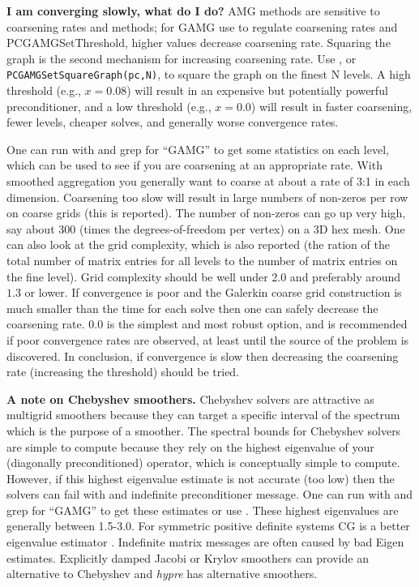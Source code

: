 {\bf I am converging slowly, what do I do?}
AMG methods are sensitive to coarsening rates and methods; for GAMG
use  to regulate coarsening rates and
PCGAMGSetThreshold, higher values decrease coarsening rate.
Squaring the graph is the second mechanism for increasing coarsening
rate.
Use , or \lstinline{PCGAMGSetSquareGraph(pc,N)}, to square the graph on the
finest N levels.  A high threshold (e.g., $x=0.08$) will result in an
expensive but potentially powerful preconditioner, and a low threshold
(e.g., $x=0.0$) will result in faster coarsening, fewer levels,
cheaper solves, and generally worse convergence rates.

One can run with  and grep for ``GAMG'' to get some statistics on each
level, which can be used to see if you are coarsening at an
appropriate rate.  With smoothed aggregation you generally want to
coarse at about a rate of 3:1 in each dimension.  Coarsening too slow
will result in large numbers of non-zeros per row on coarse grids
(this is reported).  The number of non-zeros can go up very high, say
about 300 (times the degrees-of-freedom per vertex) on a 3D hex mesh.
One can also look at the grid complexity, which is also reported (the ration of the total number of matrix entries for all levels to the number of matrix entries on the fine level).
Grid complexity should be well under 2.0 and preferably around $1.3$ or lower.  If
convergence is poor and the Galerkin coarse grid construction is much
smaller than the time for each solve then one can safely decrease the
coarsening rate.   $0.0$ is the simplest and most robust
option, and is recommended if poor
convergence rates are observed, at least until the source of the
problem is discovered.
In conclusion, if convergence is slow then decreasing the coarsening rate (increasing the threshold) should be tried.

{\bf A note on Chebyshev smoothers.} Chebyshev solvers are attractive as multigrid smoothers because they can target a specific interval of the spectrum which is the purpose of a smoother.
The spectral bounds for Chebyshev solvers are simple to compute because they rely on the highest eigenvalue of your (diagonally preconditioned) operator, which is conceptually simple to compute.
However, if this highest eigenvalue estimate is not accurate (too low) then the solvers can fail with and indefinite preconditioner message.
One can run with  and grep for ``GAMG'' to get these estimates or use .
These highest eigenvalues are generally between 1.5-3.0.
For symmetric positive definite systems CG is a better eigenvalue estimator .
Indefinite matrix messages are often caused by bad Eigen estimates.
Explicitly damped Jacobi or Krylov smoothers can provide an alternative to Chebyshev and {\it hypre} has alternative smoothers.

